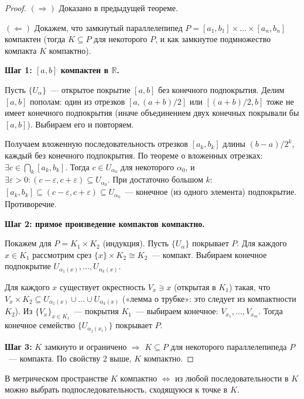 \documentclass[12pt]{article}
\begin{document}
	\begin{proof}
		$(\Rightarrow)$ Доказано в предыдущей теореме.
		
		$(\Leftarrow)$ Докажем, что замкнутый параллелепипед $P = [a_1, b_1] \times \dots \times [a_n, b_n]$ компактен (тогда $K \subseteq P$ для некоторого $P$, и как замкнутое подмножество компакта $K$ компактно).
		
		\textbf{Шаг 1: $[a, b]$ компактен в $\mathbb{R}$.}
		
		Пусть $\{U_\alpha\}$~--- открытое покрытие $[a, b]$ без конечного подпокрытия. Делим $[a, b]$ пополам: один из отрезков $[a, (a+b)/2]$ или $[(a+b)/2, b]$ тоже не имеет конечного подпокрытия (иначе объединением двух конечных покрывали бы $[a,b]$). Выбираем его и повторяем.
		
		Получаем вложенную последовательность отрезков $[a_k, b_k]$ длины $(b-a)/2^k$, каждый без конечного подпокрытия. По теореме о вложенных отрезках: $\exists c \in \bigcap_k [a_k, b_k]$. Тогда $c \in U_{\alpha_0}$ для некоторого $\alpha_0$, и $\exists \varepsilon > 0: (c - \varepsilon, c + \varepsilon) \subseteq U_{\alpha_0}$. При достаточно большом $k$: $[a_k, b_k] \subseteq (c-\varepsilon, c+\varepsilon) \subseteq U_{\alpha_0}$~--- конечное (из одного элемента) подпокрытие. Противоречие.
		
		\textbf{Шаг 2: прямое произведение компактов компактно.}
		
		Покажем для $P = K_1 \times K_2$ (индукция). Пусть $\{U_\alpha\}$ покрывает $P$. Для каждого $x \in K_1$ рассмотрим срез $\{x\} \times K_2 \cong K_2$~--- компакт. Выбираем конечное подпокрытие $U_{\alpha_1(x)}, \dots, U_{\alpha_k(x)}$.
		
		Для каждого $x$ существует окрестность $V_x \ni x$ (открытая в $K_1$) такая, что $V_x \times K_2 \subseteq U_{\alpha_1(x)} \cup \dots \cup U_{\alpha_k(x)}$ («лемма о трубке»: это следует из компактности $K_2$). Из $\{V_x\}_{x \in K_1}$~--- покрытия $K_1$~--- выбираем конечное: $V_{x_1}, \dots, V_{x_m}$. Тогда конечное семейство $\{U_{\alpha_j(x_i)}\}$ покрывает $P$.
		
		\textbf{Шаг 3:} $K$ замкнуто и ограничено $\Rightarrow$ $K \subseteq P$ для некоторого параллелепипеда $P$~--- компакта. По свойству 2 выше, $K$ компактно.
	\end{proof}
	
	\begin{theorem}
		В метрическом пространстве $K$ компактно $\Leftrightarrow$ из любой последовательности в $K$ можно выбрать подпоследовательность, сходящуюся к точке в $K$.
	\end{theorem}
	
\end{document}
